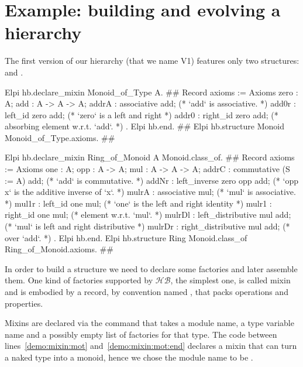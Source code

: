\documentclass[a4paper,UKenglish,cleveref, autoref]{lipics-v2019}
\newcommand{\HB}{\ensuremath{\mathcal{HB}}}
\newcommand{\mixin}{mixin}
\newcommand{\Mixins}{Mixins}
\newcommand{\factories}{factories}
\theoremstyle{implem}
\theoremstyle{implem}
\theoremstyle{axiom}
\theoremstyle{abscommand}
\theoremstyle{command}
\begin{document}
\section{Example: building and evolving a hierarchy}

The first version of our hierarchy (that we name V1) features only two
structures:  and .

\begin{coqcode}
Elpi hb.declare_mixin Monoid_of_Type A.                       #\label{demo:mixin:mot}#
  Record axioms := Axioms {
    zero : A;
    add : A -> A -> A;
    addrA : associative add;              (* `add` is associative.                  *)
    add0r : left_id zero add;             (* `zero` is a left and right             *)
    addr0 : right_id zero add;            (*   absorbing element w.r.t. `add`.      *)
}.
Elpi hb.end.                                              #\label{demo:mixin:mot:end}#
Elpi hb.structure Monoid Monoid_of_Type.axioms.        #\label{demo:structure:monoid}#

Elpi hb.declare_mixin Ring_of_Monoid A Monoid.class_of.       #\label{demo:mixin:rom}#
  Record axioms := Axioms {
    one : A;
    opp : A -> A;
    mul : A -> A -> A;
    addrC : commutative (S := A) add;    (* `add` is commutative.                   *)
    addNr : left_inverse zero opp add;   (* `opp x` is the additive inverse of `x`. *)
    mulrA : associative mul;             (* `mul` is associative.                   *)
    mul1r : left_id one mul;             (* `one` is the left and right identity    *)
    mulr1 : right_id one mul;            (*   element w.r.t. `mul`.                 *)
    mulrDl : left_distributive mul add;  (* `mul` is left and right distributive    *)
    mulrDr : right_distributive mul add; (*   over `add`.                           *)
  }.
Elpi hb.end.
Elpi hb.structure Ring Monoid.class_of Ring_of_Monoid.axioms. #\label{demo:structure:ring}#

\end{coqcode}

In order to build a structure we need to declare some \factories{} and
later assemble them. One kind of \factories{} supported by \HB{}, the simplest
one, is called \mixin{} and is embodied by a record, by convention named
, that packs operations and properties.

\Mixins{} are declared via the  command
that takes a module name,
a type variable name and a possibly empty list of \factories{} for that type.
The code between lines~\ref{demo:mixin:mot}
and~\ref{demo:mixin:mot:end} declares a \mixin{} that can turn a naked
type into a monoid, hence we chose the module name to be .
\end{document}
